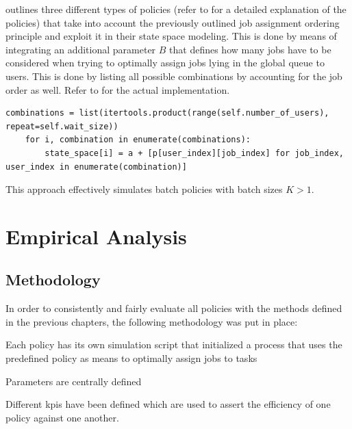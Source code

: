 \documentclass{seal_thesis}
\begin{document}
 outlines three different types of policies (refer to  for a detailed explanation of the policies) that take into account the previously outlined job assignment ordering principle and exploit it in their state space modeling. This is done by means of integrating an additional parameter $B$ that defines how many jobs have to be considered when trying to optimally assign jobs lying in the global queue to users. This is done by listing all possible combinations by accounting for the job order as well. Refer to  for the actual implementation.

\begin{lstlisting}[caption=State space modeling by considering $B$ jobs from the global queue and integrating all possible combinations,label=lst:wz_combinations,style=CustomPython]
	combinations = list(itertools.product(range(self.number_of_users), repeat=self.wait_size))
    for i, combination in enumerate(combinations):
        state_space[i] = a + [p[user_index][job_index] for job_index, user_index in enumerate(combination)]
\end{lstlisting}

This approach effectively simulates batch policies with batch sizes $K>1$.

\glsresetall

\chapter{Empirical Analysis}
\label{ch:empirical_analysis}

\section{Methodology}

In order to consistently and fairly evaluate all policies with the methods defined in the previous chapters, the following methodology was put in place:
\begin{enumerate*}
	\item Each policy has its own simulation script that initialized a process that uses the predefined policy as means to optimally assign jobs to tasks
	\item Parameters are centrally defined
	\item Different \glspl{kpi} have been defined which are used to assert the efficiency of one policy against one another.
\end{enumerate*}
\end{document}
